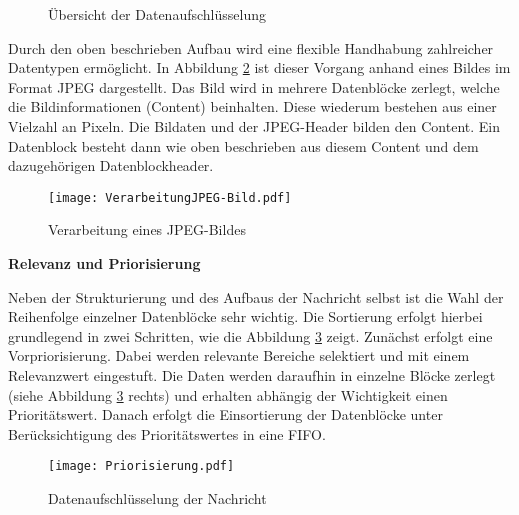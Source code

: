 \begin{figure}[H]
  \centering
  \hfill
  \caption{Übersicht der Datenaufschlüsselung}
  \label{fig:uebersichtdatenaufschluesselung}
\end{figure}

Durch den oben beschrieben Aufbau wird eine flexible Handhabung
zahlreicher Datentypen ermöglicht. In Abbildung \ref{fig:beispielJPG} ist
dieser Vorgang anhand eines Bildes im Format JPEG dargestellt. Das Bild wird in mehrere
Datenblöcke zerlegt, welche die Bildinformationen (Content) beinhalten.
Diese wiederum bestehen aus einer Vielzahl an Pixeln.
Die Bildaten und der JPEG-Header bilden den Content. Ein Datenblock besteht dann
wie oben beschrieben aus diesem Content und dem dazugehörigen Datenblockheader.

\begin{figure}[H]
	\centering
	\texttt{[image: VerarbeitungJPEG-Bild.pdf]}
	\caption{Verarbeitung eines JPEG-Bildes}
	\label{fig:beispielJPG}
\end{figure}

\textbf{Relevanz und Priorisierung}

Neben der Strukturierung und des Aufbaus der Nachricht selbst ist die
Wahl der Reihenfolge einzelner Datenblöcke sehr wichtig. Die Sortierung erfolgt
hierbei grundlegend in zwei Schritten, wie die Abbildung \ref{fig:priorisierungen}
zeigt.
Zunächst erfolgt eine Vorpriorisierung. Dabei werden relevante Bereiche
selektiert und mit einem Relevanzwert eingestuft. Die
Daten werden daraufhin in einzelne Blöcke zerlegt (siehe Abbildung
\ref{fig:priorisierungen} rechts) und erhalten abhängig der Wichtigkeit einen
Prioritätswert. Danach erfolgt die Einsortierung der Datenblöcke unter
Berücksichtigung des Prioritätswertes in eine \gls{FIFO}.

\begin{figure}[H]
	\centering
	\texttt{[image: Priorisierung.pdf]}
	\caption{Datenaufschlüsselung der Nachricht}
	\label{fig:priorisierungen}
\end{figure}
